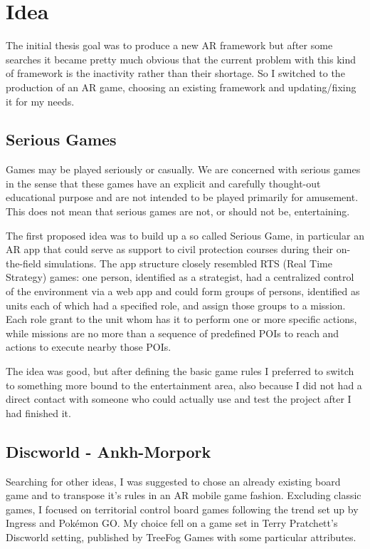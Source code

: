 \chapter{Idea}

	The initial thesis goal was to produce a new AR framework but after some searches it became pretty much obvious that the current problem with this kind of framework is the inactivity rather than their shortage.
	So I switched to the production of an AR game, choosing an existing framework and updating/fixing it for my needs.
	
	\section{Serious Games}
	
		\begin{quoting}
			Games may be played seriously or casually. We are concerned with serious games in the sense that these games have an explicit and carefully thought-out educational purpose and are not intended to be played primarily for amusement. This does not mean that serious games are not, or should not be, entertaining.~\cite{abt:serious}
		\end{quoting}
	
		The first proposed idea was to build up a so called Serious Game, in particular an AR app that could serve as support to civil protection courses during their on-the-field simulations.
		The app structure closely resembled RTS (Real Time Strategy) games: one person, identified as a strategist, had a centralized control of the environment via a web app and could form groups of persons, identified as units each of which had a specified role, and assign those groups to a mission.
		Each role grant to the unit whom has it to perform one or more specific actions, while missions are no more than a sequence of predefined POIs to reach and actions to execute nearby those POIs.
		
		The idea was good, but after defining the basic game rules I preferred to switch to something more bound to the entertainment area, also because I did not had a direct contact with someone who could actually use and test the project after I had finished it.
	
	\section{Discworld - Ankh-Morpork}
	
		Searching for other ideas, I was suggested to chose an already existing board game and to transpose it's rules in an AR mobile game fashion.
		Excluding classic games, I focused on territorial control board games following the trend set up by Ingress and Pokémon GO.
		My choice fell on a game set in Terry Pratchett's Discworld setting, published by TreeFog Games with some particular attributes.
		
